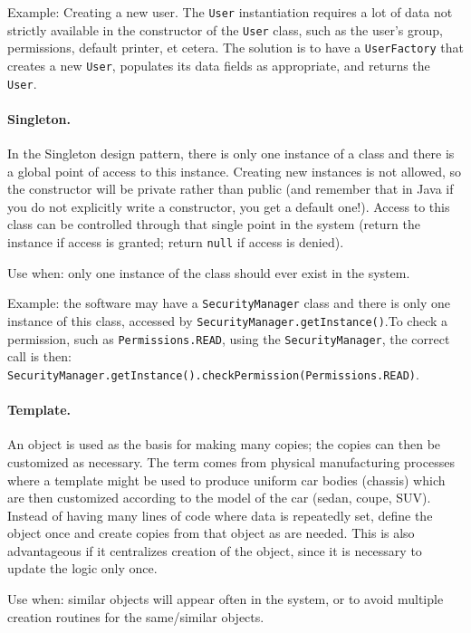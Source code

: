 Example: Creating a new user. The \texttt{User} instantiation requires a lot of data not strictly available in the constructor of the \texttt{User} class, such as the user's group, permissions, default printer, et cetera. The solution is to have a \texttt{UserFactory} that creates a new \texttt{User}, populates its data fields as appropriate, and returns the \texttt{User}.


\paragraph{Singleton.}
In the Singleton design pattern, there is only one instance of a class and there is a global point of access to this instance. Creating new instances is not allowed, so the constructor will be private rather than public (and remember that in Java if you do not explicitly write a constructor, you get a default one!). Access to this class can be controlled through that single point in the system (return the instance if access is granted; return \texttt{null} if access is denied).

Use when: only one instance of the class should ever exist in the system.

Example: the software may have a \texttt{SecurityManager} class and there is only one instance of this class, accessed by \texttt{SecurityManager.getInstance()}.To check a permission, such as \texttt{Permissions.READ}, using the \texttt{SecurityManager}, the correct call is then:\\ \texttt{SecurityManager.getInstance().checkPermission(Permissions.READ)}.

\paragraph{Template.} An object is used as the basis for making many copies; the copies can then be customized as necessary. The term comes from physical manufacturing processes where a template might be used to produce uniform car bodies (chassis) which are then customized according to the model of the car (sedan, coupe, SUV). Instead of having many lines of code where data is repeatedly set, define the object once and create copies from that object as are needed. This is also advantageous if it centralizes creation of the object, since it is necessary to update the logic only once.

Use when: similar objects will appear often in the system, or to avoid multiple creation routines for the same/similar objects.

